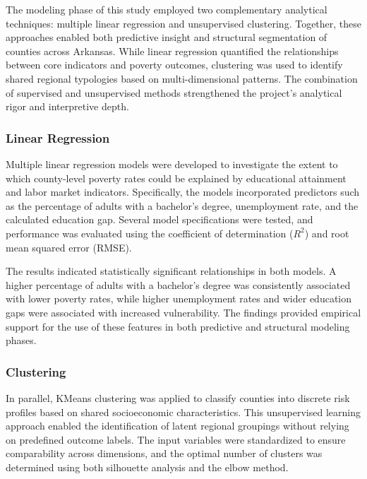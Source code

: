 \documentclass{llncs}
\begin{document}
The modeling phase of this study employed two complementary analytical techniques: multiple linear regression and unsupervised clustering. Together, these approaches enabled both predictive insight and structural segmentation of counties across Arkansas. While linear regression quantified the relationships between core indicators and poverty outcomes, clustering was used to identify shared regional typologies based on multi-dimensional patterns. The combination of supervised and unsupervised methods strengthened the project’s analytical rigor and interpretive depth.

\subsubsection{Linear Regression} \label{subsec:modeling_regression}

Multiple linear regression models were developed to investigate the extent to which county-level poverty rates could be explained by educational attainment and labor market indicators. Specifically, the models incorporated predictors such as the percentage of adults with a bachelor’s degree, unemployment rate, and the calculated education gap. Several model specifications were tested, and performance was evaluated using the coefficient of determination ($R^2$) and root mean squared error (RMSE). 

The results indicated statistically significant relationships in both models. A higher percentage of adults with a bachelor’s degree was consistently associated with lower poverty rates, while higher unemployment rates and wider education gaps were associated with increased vulnerability. The findings provided empirical support for the use of these features in both predictive and structural modeling phases.

\subsubsection{Clustering} \label{subsec:modeling_clustering}

In parallel, KMeans clustering was applied to classify counties into discrete risk profiles based on shared socioeconomic characteristics. This unsupervised learning approach enabled the identification of latent regional groupings without relying on predefined outcome labels. The input variables were standardized to ensure comparability across dimensions, and the optimal number of clusters was determined using both silhouette analysis and the elbow method. 
\end{document}
